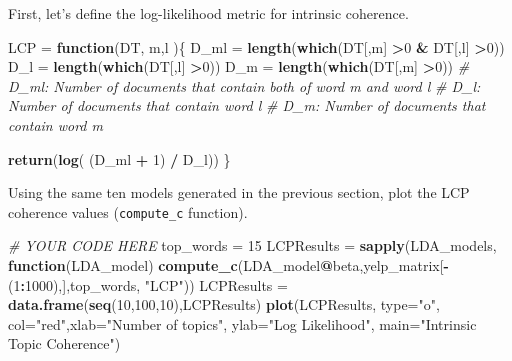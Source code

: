 \documentclass[]{article}
\newenvironment{Shaded}{\begin{snugshade}}{\end{snugshade}}
\newcommand{\CommentTok}[1]{\textcolor[rgb]{0.56,0.35,0.01}{\textit{#1}}}
\newcommand{\ControlFlowTok}[1]{\textcolor[rgb]{0.13,0.29,0.53}{\textbf{#1}}}
\newcommand{\DataTypeTok}[1]{\textcolor[rgb]{0.13,0.29,0.53}{#1}}
\newcommand{\DecValTok}[1]{\textcolor[rgb]{0.00,0.00,0.81}{#1}}
\newcommand{\KeywordTok}[1]{\textcolor[rgb]{0.13,0.29,0.53}{\textbf{#1}}}
\newcommand{\NormalTok}[1]{#1}
\newcommand{\OperatorTok}[1]{\textcolor[rgb]{0.81,0.36,0.00}{\textbf{#1}}}
\newcommand{\StringTok}[1]{\textcolor[rgb]{0.31,0.60,0.02}{#1}}
\begin{document}
First, let's define the log-likelihood metric for intrinsic coherence.

\begin{Shaded}
\begin{Highlighting}[]
\NormalTok{LCP =}\StringTok{ }\ControlFlowTok{function}\NormalTok{(DT, m,l )\{  }
\NormalTok{  D_ml =}\StringTok{ }\KeywordTok{length}\NormalTok{(}\KeywordTok{which}\NormalTok{(DT[,m] }\OperatorTok{>}\DecValTok{0} \OperatorTok{&}\StringTok{ }\NormalTok{DT[,l] }\OperatorTok{>}\DecValTok{0}\NormalTok{)) }
\NormalTok{  D_l =}\StringTok{ }\KeywordTok{length}\NormalTok{(}\KeywordTok{which}\NormalTok{(DT[,l] }\OperatorTok{>}\DecValTok{0}\NormalTok{))}
\NormalTok{  D_m =}\StringTok{ }\KeywordTok{length}\NormalTok{(}\KeywordTok{which}\NormalTok{(DT[,m] }\OperatorTok{>}\DecValTok{0}\NormalTok{))}
  \CommentTok{# D_ml: Number of documents that contain both of word m and word l}
  \CommentTok{# D_l: Number of documents that contain word l}
  \CommentTok{# D_m: Number of documents that contain word m }
  
  \KeywordTok{return}\NormalTok{(}\KeywordTok{log}\NormalTok{( (D_ml }\OperatorTok{+}\StringTok{ }\DecValTok{1}\NormalTok{) }\OperatorTok{/}\StringTok{ }\NormalTok{D_l))}
\NormalTok{\}}
\end{Highlighting}
\end{Shaded}

Using the same ten models generated in the previous section, plot the
LCP coherence values (\texttt{compute\_c} function).

\begin{Shaded}
\begin{Highlighting}[]
\CommentTok{# YOUR CODE HERE}
\NormalTok{top_words =}\StringTok{ }\DecValTok{15}
\NormalTok{LCPResults =}\StringTok{ }\KeywordTok{sapply}\NormalTok{(LDA_models, }\ControlFlowTok{function}\NormalTok{(LDA_model) }\KeywordTok{compute_c}\NormalTok{(LDA_model}\OperatorTok{@}\NormalTok{beta,yelp_matrix[}\OperatorTok{-}\NormalTok{(}\DecValTok{1}\OperatorTok{:}\DecValTok{1000}\NormalTok{),],top_words, }\StringTok{"LCP"}\NormalTok{))}
\NormalTok{LCPResults =}\StringTok{ }\KeywordTok{data.frame}\NormalTok{(}\KeywordTok{seq}\NormalTok{(}\DecValTok{10}\NormalTok{,}\DecValTok{100}\NormalTok{,}\DecValTok{10}\NormalTok{),LCPResults)}
\KeywordTok{plot}\NormalTok{(LCPResults, }\DataTypeTok{type=}\StringTok{"o"}\NormalTok{, }\DataTypeTok{col=}\StringTok{"red"}\NormalTok{,}\DataTypeTok{xlab=}\StringTok{"Number of topics"}\NormalTok{, }\DataTypeTok{ylab=}\StringTok{"Log Likelihood"}\NormalTok{, }\DataTypeTok{main=}\StringTok{"Intrinsic Topic Coherence"}\NormalTok{)}
\end{Highlighting}
\end{Shaded}
\end{document}
